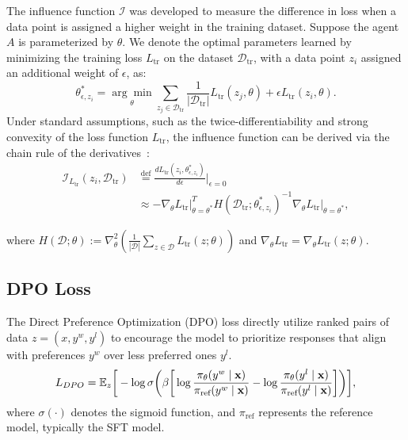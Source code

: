 The influence function $\mathcal{I}$ was developed to measure the difference in loss when a data point is assigned a higher weight in the training dataset.  Suppose the agent $A$ is parameterized by $\theta$. We denote the optimal parameters learned by minimizing the training loss $L_{\text{tr}}$ on the dataset $\mathcal{D}_{\text{tr}}$, with a data point $z_i$ assigned an additional weight of $\epsilon$, as:
\begin{equation}
    \theta_{\epsilon, z_i}^* = \underset{\theta}{\arg\min} \sum_{z_j\in \mathcal{D}_{\text{tr}}} \frac{1}{|\mathcal{D}_{\text{tr}}|} L_{\text{tr}}(z_j, \theta) + \epsilon L_{\text{tr}}(z_i, \theta).
\end{equation}
Under standard assumptions, such as the twice-differentiability and strong convexity of the loss function $L_{\text{tr}}$, the influence function can be derived via the chain rule of the derivatives~\cite{DBLP:conf/icml/KohL17}:
\begin{equation}
\begin{split}
    \mathcal{I}_{L_{\text{tr}}}(z_i, \mathcal{D}_{\text{tr}}) &\stackrel{\text{def}}{=} \frac{d L_{\text{tr}}(z_i, \theta_{\epsilon, z_i}^*)}{d\epsilon} \bigg|_{\epsilon=0} \\
    &\approx -\nabla_\theta L_{\text{tr}} \big|_{\theta=\theta^*}^T H(\mathcal{D}_{\text{tr}}; \theta_{\epsilon, z_i}^*)^{-1} \nabla_\theta L_{\text{tr}} \big|_{\theta=\theta^*},
    \label{equation:influence score}
\end{split}
\end{equation}

where $H(\mathcal{D}; \theta) := \nabla_\theta^2\left(\frac{1}{|\mathcal{D}|} \sum_{z\in \mathcal{D}}L_{\text{tr}}(z; \theta)\right)$ and $\nabla_\theta L_{\text{tr}} = \nabla_\theta L_{\text{tr}}(z;\theta)$.

\subsection{DPO Loss}
The Direct Preference Optimization (DPO) loss directly utilize ranked pairs of data $z=(x,y^w,y^l)$ to encourage the model to prioritize responses that align with preferences $y^w$ over less preferred ones $y^l$.
\begin{equation}
\small
    L_{DPO} = \mathbb{E}_{z} \bigg[ 
    -\log \sigma \bigg( \beta \bigg[
        \log \frac{\pi_\theta(y^w \mid \mathbf{x})}{\pi_{\text{ref}}(y^w \mid \mathbf{x})} 
        - \log \frac{\pi_\theta(y^l \mid \mathbf{x})}{\pi_{\text{ref}}(y^l \mid \mathbf{x})}
    \bigg] \bigg) \bigg],
\end{equation}
where $\sigma(\cdot)$ denotes the sigmoid function, and $\pi_{\text{ref}}$ represents the reference model, typically the SFT model.